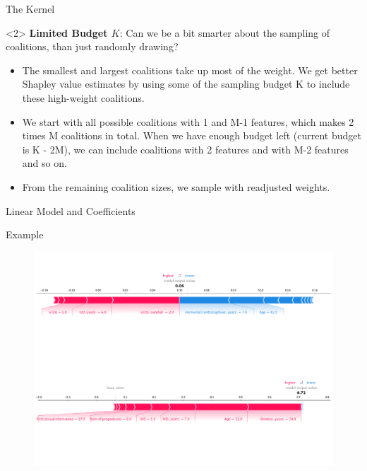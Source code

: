 \documentclass[11pt,compress,t,notes=noshow, aspectratio=169, xcolor=table]{beamer}
\begin{document}
\begin{vbframe}{The Kernel}
\begin{onlyenv}<2>
\textbf{Limited Budget $K$}: Can we be a bit smarter about the sampling of coalitions, than just randomly drawing?
\begin{itemize}
    \item The smallest and largest coalitions take up most of the weight. We get better Shapley value estimates by using some of the sampling budget K to include these high-weight coalitions.
    \item We start with all possible coalitions with 1 and M-1 features, which makes 2 times M coalitions in total. When we have enough budget left (current budget is K - 2M), we can include coalitions with 2 features and with M-2 features and so on.
    \item From the remaining coalition sizes, we sample with readjusted weights.
\end{itemize}
\end{onlyenv}
  

 \end{vbframe}
 
 \begin{vbframe}{Linear Model and Coefficients}

 \end{vbframe}
 
\begin{vbframe}{Example}

\begin{figure}
    \centering
    \includegraphics[width=0.7\columnwidth]{slides/shapley/figure_man/molnar-shapplot.png}
\end{figure}

\end{vbframe}
\end{document}
